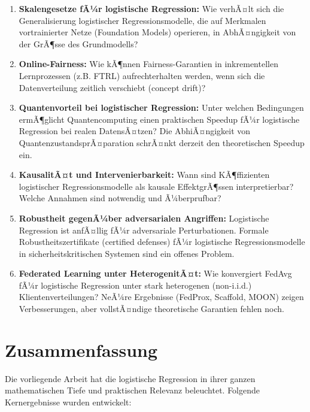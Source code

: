 ﻿\documentclass[12pt, a4paper]{article}
\theoremstyle{definition}
\theoremstyle{remark}
\begin{document}
\begin{enumerate}[label=\textbf{F\arabic*.}]
  \item \textbf{Skalengesetze fÃ¼r logistische Regression:} Wie verhÃ¤lt sich die
    Generalisierung logistischer Regressionsmodelle, die auf Merkmalen vortrainierter
    Netze (Foundation Models) operieren, in AbhÃ¤ngigkeit von der GrÃ¶sse des Grundmodells?

  \item \textbf{Online-Fairness:} Wie kÃ¶nnen Fairness-Garantien in inkrementellen
    Lernprozessen (z.B. FTRL) aufrechterhalten werden, wenn sich die Datenverteilung zeitlich
    verschiebt (concept drift)?

  \item \textbf{Quantenvorteil bei logistischer Regression:} Unter welchen Bedingungen
    ermÃ¶glicht Quantencomputing einen praktischen Speedup fÃ¼r logistische Regression bei
    realen DatensÃ¤tzen? Die AbhiÃ¤ngigkeit von QuantenzustandsprÃ¤paration schrÃ¤nkt
    derzeit den theoretischen Speedup ein.

  \item \textbf{KausalitÃ¤t und Intervenierbarkeit:} Wann sind KÃ¶ffizienten logistischer
    Regressionsmodelle als kausale EffektgrÃ¶ssen interpretierbar? Welche Annahmen sind
    notwendig und Ã¼berprufbar?

  \item \textbf{Robustheit gegenÃ¼ber adversarialen Angriffen:} Logistische Regression ist
    anfÃ¤llig fÃ¼r adversariale Perturbationen. Formale Robustheitszertifikate (certified
    defenses) fÃ¼r logistische Regressionsmodelle in sicherheitskritischen Systemen sind
    ein offenes Problem.

  \item \textbf{Federated Learning unter HeterogenitÃ¤t:} Wie konvergiert FedAvg fÃ¼r
    logistische Regression unter stark heterogenen (non-i.i.d.) Klientenverteilungen?
    NeÃ¼re Ergebnisse (FedProx, Scaffold, MOON) zeigen Verbesserungen, aber vollstÃ¤ndige
    theoretische Garantien fehlen noch.
\end{enumerate}

\section{Zusammenfassung}

Die vorliegende Arbeit hat die logistische Regression in ihrer ganzen mathematischen Tiefe
und praktischen Relevanz beleuchtet. Folgende Kernergebnisse wurden entwickelt:
\end{document}
